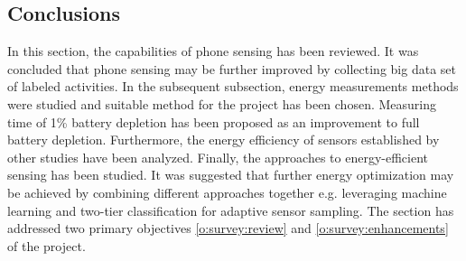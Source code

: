 \subsection{Conclusions}
\hspace{10pt} In this section, the capabilities of phone sensing has been reviewed. It was concluded that phone sensing may be further improved by collecting big data set of labeled activities. In the subsequent subsection, energy measurements methods were studied and suitable method for the project has been chosen. Measuring time of 1\% battery depletion has been proposed as an improvement to full battery depletion. Furthermore, the energy efficiency of sensors established by other studies have been analyzed. Finally, the approaches to energy-efficient sensing has been studied. It was suggested that further energy optimization may be achieved by combining different approaches together e.g. leveraging machine learning and two-tier classification for adaptive sensor sampling. The section has addressed two primary objectives \ref{o:survey:review} and \ref{o:survey:enhancements} of the project.